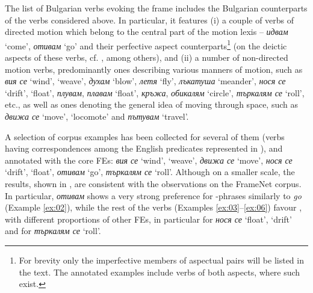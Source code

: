 \documentclass[output=paper,colorlinks,citecolor=brown]{langscibook}
\begin{document}
The list of Bulgarian verbs evoking the  frame includes the Bulgarian counterparts of the verbs considered above. In particular, it features (i) a couple of verbs of directed motion which belong to the central part of the motion lexis -- \textit{идвам} `come’, \textit{отивам} `go’ and their perfective aspect counterparts\footnote{For brevity only the imperfective members of aspectual pairs will be listed in the text. The annotated examples include verbs of both aspects, where such exist.} (on the deictic aspects of these verbs, cf.  \cite{Nitsolova1984,Trifonova1982,Stanisheva1985}, among others), and (ii) a number of non-directed motion verbs, predominantly ones describing various manners of motion, such as \textit{вия се} `wind’, `weave’, \textit{духам} `blow’, \textit{летя} `fly’, \textit{лъкатуша} `meander’, \textit{нося се} `drift’, `float’, \textit{плувам}, \textit{плавам} `float’, \textit{кръжа}, \textit{обикалям} `circle’, \textit{търкалям се} `roll’, etc., as well as ones denoting the general idea of moving through space, such as \textit{движа се} `move’, `locomote’ and \textit{пътувам} `travel’.

A selection of corpus examples has been collected for several of them (verbs having correspondences among the English predicates represented in ), and annotated with the core FEs: \textit{вия се} `wind’, `weave’, \textit{движа се} `move’, \textit{нося се} `drift’, `float’, \textit{отивам} `go’, \textit{търкалям се} `roll’. Although on a smaller scale, the results, shown in , are consistent with the observations on the FrameNet corpus. In particular, \textit{отивам} shows a very strong preference for -phrases similarly to \textit{go} (Example \ref{ex:02}), while the rest of the verbs (Examples \ref{ex:03}--\ref{ex:06}) favour , with different proportions of other FEs, in particular  for \textit{нося се} `float’, `drift’ and  for \textit{търкалям се} `roll’.
\end{document}
